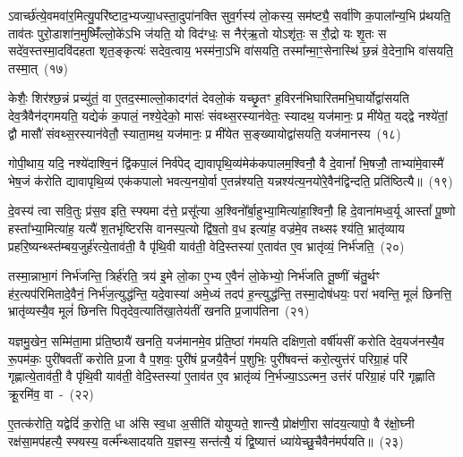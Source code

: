 ऽवार्च्छ॑त्ये॒वमवा॑र॒मित्यु॒परि॑ष्टाद॒भ्यज्या॒धस्ता॒दुपा॑नक्ति सुव॒र्गस्य॑ लो॒कस्य॒ सम॑ष्ट्यै॒ सर्वा॑णि क॒पाला᳚न्य॒भि प्र॑थयति॒ ताव॑तः पुरो॒\-डाशा॑\-न॒मुष्मिँ॑ल्लो॒के॑\-ऽभि ज॑यति॒ यो विद॑ग्धः॒ स नैर्॑\mbox{}ऋ॒तो यो\-ऽशृ॑तः॒ स रौ॒द्रो यः शृ॒तः स सदे॑व॒स्तस्मा॒दवि॑दहता शृत॒ङ्कृत्यः॑ सदेव॒त्वाय॒ भस्म॑ना॒\-ऽभि वा॑सयति॒ तस्मा᳚न्मा॒ꣳ॒सेनास्थि॑ छ॒न्नं वे॒देना॒भि वा॑सयति॒ तस्मा॒त्~(१७)\ip

केशैः॒ शिर॑श्छ॒न्नं प्रच्यु॑तं॒ वा ए॒तद॒स्माल्लो॒कादग॑तं देवलो॒कं यच्छृ॒तꣳ ह॒विरन॑भि\-घारितमभि॒\-घार्योद्वा॑सयति देव॒त्रैवैन॑द्गमयति॒ यद्येकं॑ क॒पालं॒ नश्ये॒देको॒ मासः॑ संवथ्स॒रस्यान॑वेतः॒ स्यादथ॒ यज॑मानः॒ प्र मी॑येत॒ यद्द्वे नश्ये॑तां॒ द्वौ मासौ॑ संवथ्स॒रस्यान॑वेतौ॒ स्याता॒मथ॒ यज॑मानः॒ प्र मी॑येत स॒ङ्ख्यायोद्वा॑सयति॒ यज॑मानस्य~(१८)\ip

गोपी॒थाय॒ यदि॒ नश्ये॑दाश्वि॒नं द्वि॑कपा॒लं निर्व॑पेद् द्यावा\-पृथि॒व्य॑मेक॑कपालम॒श्विनौ॒ वै दे॒वानां᳚ भि॒षजौ॒ ताभ्या॑मे॒वास्मै॑ भेष॒जं क॑रोति द्यावा\-पृथि॒व्य॑ एक॑कपालो भवत्य॒नयो॒र्वा ए॒तन्न॑श्यति॒ यन्नश्य॑त्य॒नयो॑रे॒वैन॑द्विन्दति॒ प्रति॑ष्ठित्यै॥~(१९)\ip

{\anuvakamend[{प्रा॒जा॒प॒त्यन्ते\-ऽक्षो\-ऽनु॑पाक्तो वे॒देना॒\-ऽभि वा॑सयति॒ तस्मा॒द्यज॑मानस्य॒ द्वात्रिꣳ॑शच्च}]}

दे॒वस्य॑ त्वा सवि॒तुः प्र॑स॒व इति॒ स्फ्यमा द॑त्ते॒ प्रसू᳚त्या अ॒श्विनो᳚र्बा॒हुभ्या॒मित्या॑हा॒श्विनौ॒ हि दे॒वाना॑मध्व॒र्यू आस्तां᳚ पू॒ष्णो हस्ता᳚भ्या॒मित्या॑ह॒ यत्यै॑ श॒तभृ॑ष्टिरसि वानस्प॒त्यो द्वि॑ष॒तो व॒ध इत्या॑ह॒ वज्र॑मे॒व तथ्सꣴ श्य॑ति॒ भ्रातृ॑व्याय प्रहरि॒ष्यन्थ्स्त॑म्बय॒जुर्\mbox{}ह॑रत्ये॒ताव॑ती॒ वै पृ॑थि॒वी याव॑ती॒ वेदि॒स्तस्या॑ ए॒ताव॑त ए॒व भ्रातृ॑व्यं॒ निर्भ॑जति॒~(२०)\ip

तस्मा॒न्नाभा॒गं निर्भ॑जन्ति॒ त्रिर्\mbox{}ह॑रति॒ त्रय॑ इ॒मे लो॒का ए॒भ्य ए॒वैनं॑ लो॒केभ्यो॒ निर्भ॑जति तू॒ष्णीं च॑तु॒र्थꣳ ह॑र॒त्यप॑रिमितादे॒वैनं॒ निर्भ॑ज॒त्युद्ध॑न्ति॒ यदे॒वास्या॑ अमे॒ध्यं तदप॑ ह॒न्त्युद्ध॑न्ति॒ तस्मा॒दोष॑धयः॒ परा॑ भवन्ति॒ मूलं॑ छिनत्ति॒ भ्रातृ॑व्यस्यै॒व मूलं॑ छिनत्ति पितृदेव॒त्याति॑खा॒तेय॑तीं खनति प्र॒जा\-प॑तिना~(२१)\ip

यज्ञमु॒खेन॒ सम्मि॑ता॒मा प्र॑ति॒ष्ठायै॑ खनति॒ यज॑मानमे॒व प्र॑ति॒ष्ठां ग॑मयति दक्षिण॒तो वर्\mbox{}षी॑यसीं करोति देव॒यज॑नस्यै॒व रू॒पम॑कः॒ पुरी॑षवतीं करोति प्र॒जा वै प॒शवः॒ पुरी॑षं प्र॒जयै॒वैनं॑ प॒शुभिः॒ पुरी॑षवन्तं करो॒त्युत्त॑रं परिग्रा॒हं परि॑ गृह्णात्ये॒ताव॑ती॒ वै पृ॑थि॒वी याव॑ती॒ वेदि॒स्तस्या॑ ए॒ताव॑त ए॒व भ्रातृ॑व्यं नि॒र्भज्या॒\-ऽऽ\-त्मन॒ उत्त॑रं परिग्रा॒हं परि॑ गृह्णाति क्रू॒रमि॑व॒ वा~-~(२२)\ip

ए॒तत्क॑रोति॒ यद्वेदिं॑ क॒रोति॒ धा अ॑सि स्व॒धा अ॒सीति॑ योयुप्यते॒ शान्त्यै॒ प्रोक्ष॑णी॒रा सा॑दय॒त्यापो॒ वै र॑क्षो॒घ्नी रक्ष॑सा॒मप॑हत्यै॒ स्फ्यस्य॒ वर्त्म᳚न्थ्सादयति य॒ज्ञस्य॒ सन्त॑त्यै॒ यं द्वि॒ष्यात्तं ध्या॑येच्छु॒चैवैन॑मर्पयति॥~(२३)\ip

